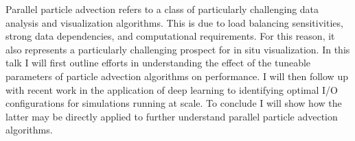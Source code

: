 \license


Parallel particle advection refers to a class of particularly challenging data analysis and visualization algorithms. This is due to load balancing sensitivities, strong data dependencies, and computational requirements. For this reason, it also represents a particularly challenging prospect for in situ visualization. In this talk I will first outline efforts in understanding the effect of the tuneable parameters of particle advection algorithms on performance. I will then follow up with recent work in the application of deep learning to identifying optimal I/O configurations for simulations running at scale. To conclude I will show how the latter may be directly applied to further understand parallel particle advection algorithms.

